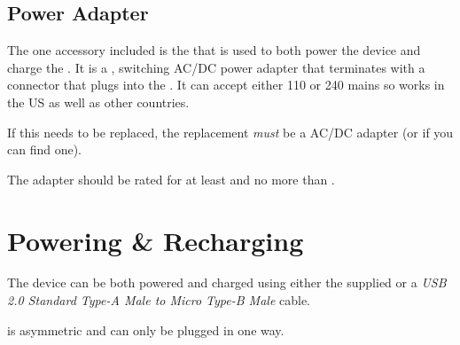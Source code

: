 \section{Power Adapter} \label{Power Adapter}

The one accessory included is the  that is used to both power the device
and charge the \hyperref[Rechargeable Battery]{}.  It is a
,  switching AC/DC power adapter
that terminates with a  connector that plugs into the
\hyperref[Power Port]{}.  It can accept either \num{110} or \num{240}
 mains so works in the US as well as other countries.

\par\medskip

If this needs to be replaced, the replacement \textit{must} be a
 AC/DC adapter (or  if you can find
one).



The adapter should be rated for at least  and no more than
.

\chapter{Powering \& Recharging} \label{Powering and Recharging}

The device can be both powered and charged using either the supplied
\hyperref[Power Adapter]{} or a \textit{USB 2.0 Standard Type-A Male to
Micro Type-B Male} cable.

\par\medskip

 is asymmetric and can only be plugged in one way.

